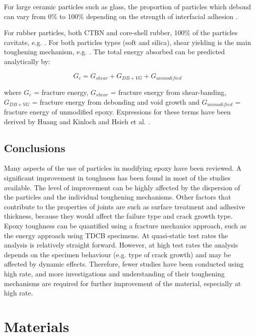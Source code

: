 \documentclass[numbers=noendperiod,chapterprefix=on]{icldt} %
\begin{document}
For large ceramic particles such as glass, the proportion of particles which debond can vary from 0\% to 100\% depending on the strength of interfacial adhesion \cite{Spanoudakis1984,Broutman197198}.

For rubber particles, both CTBN and core-shell rubber, 100\% of the particles cavitate, e.g. \cite{Hsieh2010}. For both particles types (soft and silica), shear yielding is the main toughening mechanism, e.g. \cite{Hsieh2010}. The total energy absorbed can be predicted analytically by:

\begin{equation} 
G_c = G_{shear} + G_{DB+VG} +G_{unmodified}
\end{equation}

where $G_c$ = fracture energy, $G_{shear}$ = fracture energy from shear-banding, $G_{DB+VG}$ = fracture energy from debonding and void growth and $G_{unmodified}$ = fracture energy of unmodified epoxy. Expressions for these terms have been derived by Huang and Kinloch \cite{Huang1992a} and Hsieh et al. \cite{Mohammed2007}. 



\section{Conclusions}
Many aspects of the use of particles in modifying epoxy have been reviewed. A significant improvement in toughness has been found in most of the studies available. The level of improvement can be highly affected by the dispersion of the particles and the individual toughening mechanisms. Other factors that contribute to the properties of joints are such as surface treatment and adhesive thickness, because they would affect the failure type and crack growth type.
Epoxy toughness can be quantified using a fracture mechanics approach, such as the energy approach using TDCB specimens. At quasi-static test rates the analysis is relatively straight forward. However, at high test rates the analysis depends on the specimen behaviour (e.g. type of crack growth) and may be affected by dynamic effects.
Therefore, fewer studies have been conducted using high rate, and more investigations and understanding of their toughening mechanisms are required for further improvement of the material, especially at high rate.

\chapter{Materials}
\end{document}
